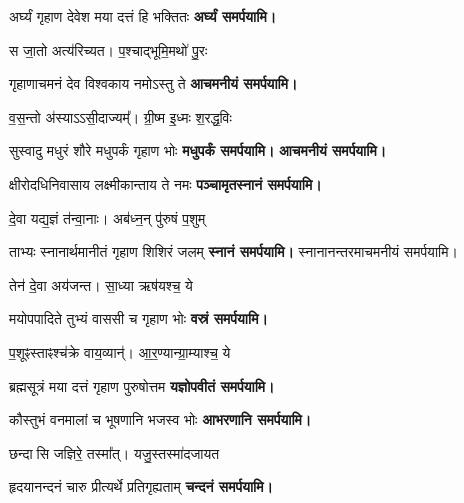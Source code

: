 \begin{center}
{अर्घ्यं गृहाण देवेश मया दत्तं हि भक्तितः}
\textbf{\devAya{} अर्घ्यं समर्पयामि।}

{स जा॒तो अत्य॑रिच्यत। प॒श्चाद्भूमि॒मथो॑ पु॒रः}

{गृहाणाचमनं देव विश्वकाय नमोऽस्तु ते}
\textbf{\devAya{} आचमनीयं समर्पयामि।}
\medskip

{व॒स॒न्तो अ॑स्याऽऽसी॒दाज्यम्᳚। ग्री॒ष्म इ॒ध्मः श॒रद्ध॒विः}

{सुस्वादु मधुरं शौरे मधुपर्कं गृहाण भोः}
\textbf{\devAya{} मधुपर्कं समर्पयामि।}
\textbf{\devAya{} आचमनीयं समर्पयामि।}
\medskip

{क्षीरोदधिनिवासाय लक्ष्मीकान्ताय ते नमः}
\textbf{\devAya{} पञ्चामृतस्नानं समर्पयामि।}
\medskip

{दे॒वा यद्य॒ज्ञं त॑न्वा॒नाः। अब॑ध्न॒न् पु॑रुषं प॒शुम्}

{ताभ्यः स्नानार्थमानीतं गृहाण शिशिरं जलम्}
\textbf{\devAya{} स्नानं समर्पयामि।}
स्नानानन्तरमाचमनीयं समर्पयामि।
\medskip

{तेन॑ दे॒वा अय॑जन्त। सा॒ध्या ऋष॑यश्च॒ ये}

{मयोपपादिते तुभ्यं वाससी च गृहाण भोः}
\textbf{\devAya{} वस्रं समर्पयामि।}
\medskip

{प॒शूꣴस्ताꣴश्च॑क्रे वाय॒व्यान्॑। आ॒र॒ण्यान्ग्रा॒म्याश्च॒ ये}

{ब्रह्मसूत्रं मया दत्तं गृहाण पुरुषोत्तम}
\textbf{\devAya{} यज्ञोपवीतं समर्पयामि। }
\medskip

{कौस्तुभं वनमालां च भूषणानि भजस्व भोः}
\textbf{\devAya{} आभरणानि समर्पयामि।}
\medskip

{छन्दासि जज्ञिरे॒ तस्मा᳚त्। यजु॒स्तस्मा॑दजायत}

{हृदयानन्दनं चारु प्रीत्यर्थे प्रतिगृह्यताम्}
\textbf{\devAya{} चन्दनं समर्पयामि।}
\medskip


\end{center}

